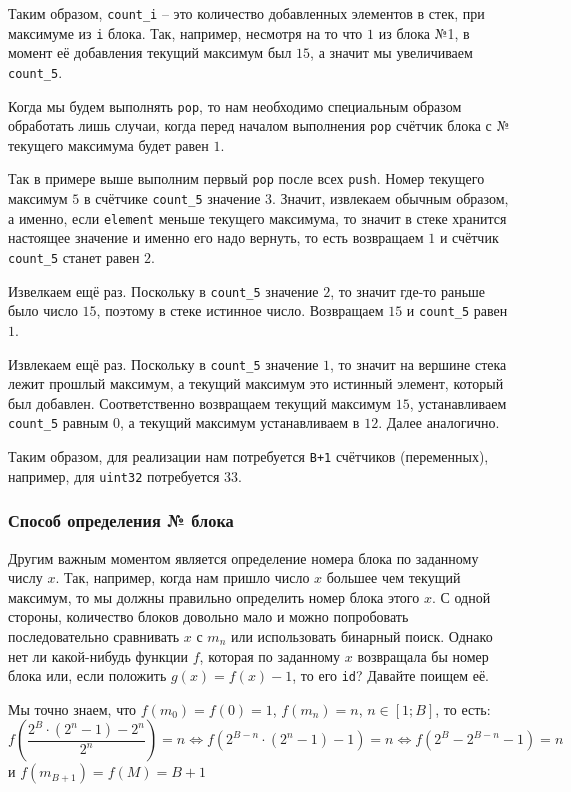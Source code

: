 Таким образом, \texttt{count_i} -- это количество добавленных элементов в стек, при максимуме из \texttt{i} блока. Так, например, несмотря на то что \(1\)  из блока №1, в момент её добавления текущий максимум был \(15\), а значит мы увеличиваем \texttt{count_5}.

Когда мы будем выполнять \texttt{pop}, то нам необходимо специальным образом обработать лишь случаи, когда перед началом выполнения \texttt{pop} счётчик блока с № текущего максимума будет равен \(1\). 

Так в примере выше выполним первый \texttt{pop} после всех \texttt{push}. Номер текущего максимум \(5\) в счётчике \texttt{count_5} значение \(3\). Значит, извлекаем обычным образом, а именно, если \texttt{element} меньше текущего максимума, то значит в стеке хранится настоящее значение и именно его надо вернуть, то есть возвращаем \(1\) и счётчик \texttt{count_5} станет равен \(2\). 

Извелкаем ещё раз. Поскольку в \texttt{count_5} значение \(2\), то значит где-то раньше было число \(15\), поэтому в стеке истинное число. Возвращаем \(15\) и \texttt{count_5} равен \(1\).

Извлекаем ещё раз. Поскольку в \texttt{count_5} значение \(1\), то значит на вершине стека лежит прошлый максимум, а текущий максимум это истинный элемент, который был добавлен. Соответственно возвращаем текущий максимум \(15\), устанавливаем \texttt{count_5} равным \(0\), а текущий максимум устанавливаем в \(12\). Далее аналогично.

Таким образом, для реализации нам потребуется \texttt{B+1} счётчиков (переменных), например, для \texttt{uint32} потребуется \(33\).

\subsubsection{Способ определения № блока}
Другим важным моментом является определение номера блока по заданному числу \(x\).  Так, например, когда нам пришло число \(x\) большее чем текущий максимум, то мы должны правильно определить номер блока этого \(x\). С одной стороны, количество блоков довольно мало и можно попробовать последовательно сравнивать \(x\) с \(m_n\) или использовать бинарный поиск. Однако нет ли какой-нибудь функции \(f\), которая по заданному \(x\) возвращала бы номер блока или, если положить \(g(x) = f(x) - 1\), то его \texttt{id}? Давайте поищем её.

Мы точно знаем, что \(f(m_0) = f(0) = 1\), \(f(m_n) = n\), \(n \in [1;B]\), то есть:
\begin{dmath}[labelN={3}]
    f\left(\frac{2^B\cdot\left(2^n - 1\right) -2^n}{2^n}\right) = n
\Leftrightarrow
f\left(2^{B-n}\cdot\left(2^n - 1\right) - 1 \right) = n
\Leftrightarrow
f\left(2^{B} - 2^{B-n} - 1 \right) = n  
\end{dmath}
и \(f(m_{B+1}) = f(M) = B+1\)


